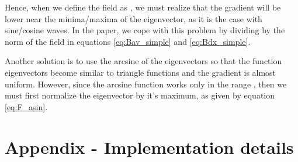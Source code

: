 \documentclass{article} \usepackage{arxiv,times}
\begin{document}
Hence, when we define the field  as , we must realize that the gradient will be lower near the minima/maxima of the eigenvector, as it is the case with sine/cosine waves. In the paper, we cope with this problem by dividing by the norm of the field  in equations \ref{eq:Bav_simple} and \ref{eq:Bdx_simple}.

Another solution is to use the arcsine of the eigenvectors so that the function eigenvectors become similar to triangle functions and the gradient is almost uniform. However, since the arcsine function works only in the range , then we must first normalize the eigenvector by it's maximum, as given by equation \ref{eq:F_asin}.





\section{Appendix - Implementation details}
\end{document}
